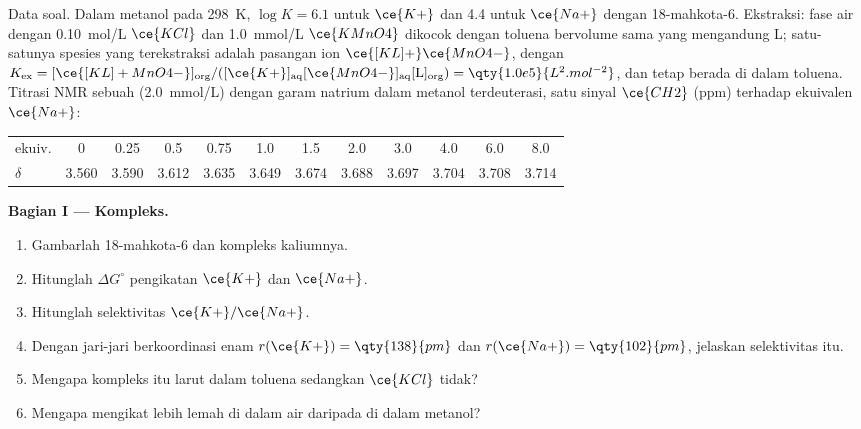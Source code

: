 \begin{problem}
\label{pb:b3:supramolecular:1}
Data soal. Dalam metanol pada \qty{298}{K}, $\log K = 6.1$ untuk $\ce{K+}$ dan 4.4 untuk $\ce{Na+}$ dengan
18-mahkota-6. Ekstraksi: fase air dengan \qty{0.10}{mol/L} $\ce{KCl}$ dan \qty{1.0}{mmol/L} $\ce{KMnO4}$ dikocok
dengan toluena bervolume sama yang mengandung  L; satu-satunya spesies
yang terekstraksi adalah pasangan ion $\ce{[KL]+}\ce{MnO4-}$, dengan
$K_{\mathrm{ex}} = [\ce{[KL]+MnO4-}]_{\mathrm{org}}/([\ce{K+}]_{\mathrm{aq}}[\ce{MnO4-}]_{\mathrm{aq}}[\mathrm L]_{\mathrm{org}}) = \qty{1.0e5}{L^2.mol^{-2}}$, dan  tetap berada di dalam toluena. Titrasi NMR sebuah
 (\qty{2.0}{mmol/L}) dengan garam natrium dalam metanol terdeuterasi, satu sinyal $\ce{CH2}$
(ppm) terhadap ekuivalen $\ce{Na+}$:

\begin{center}\small
\begin{tabular}{l*{11}{c}}
\hline
ekuiv. & 0 & 0.25 & 0.5 & 0.75 & 1.0 & 1.5 & 2.0 & 3.0 & 4.0 & 6.0 & 8.0\\
$\delta$ & 3.560 & 3.590 & 3.612 & 3.635 & 3.649 & 3.674 & 3.688 & 3.697 & 3.704 & 3.708 & 3.714\\
\hline
\end{tabular}
\end{center}

\medskip\noindent\textbf{Bagian I --- Kompleks.}
\begin{enumerate}[beginpenalty=10000]
  \item Gambarlah 18-mahkota-6 dan kompleks kaliumnya.
  \item Hitunglah $\Delta G^\circ$ pengikatan $\ce{K+}$ dan $\ce{Na+}$.
  \item Hitunglah selektivitas $\ce{K+}/\ce{Na+}$.
  \item Dengan jari-jari berkoordinasi enam $r(\ce{K+}) = \qty{138}{pm}$ dan $r(\ce{Na+}) = \qty{102}{pm}$, jelaskan selektivitas itu.
  \item Mengapa kompleks itu larut dalam toluena sedangkan $\ce{KCl}$ tidak?
  \item Mengapa  mengikat lebih lemah di dalam air daripada di dalam metanol?
\end{enumerate}


\end{problem}
